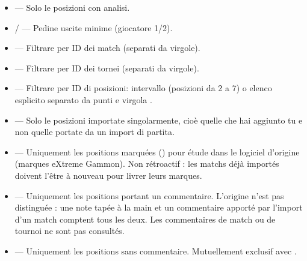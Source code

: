 \documentclass[letterpaper,10pt,italian]{sphinxmanual}
\begin{document}
\begin{itemize}
\item {} 
\sphinxAtStartPar
{} — Solo le posizioni con analisi.

\item {} 
\sphinxAtStartPar
{} /  — Pedine uscite minime (giocatore 1/2).

\item {} 
\sphinxAtStartPar
{} — Filtrare per ID dei match (separati da virgole).

\item {} 
\sphinxAtStartPar
{} — Filtrare per ID dei tornei (separati da virgole).

\item {} 
\sphinxAtStartPar
{} — Filtrare per ID di posizioni: intervallo  (posizioni da 2 a 7) o elenco esplicito separato da punti e virgola .

\item {} 
\sphinxAtStartPar
{} — Solo le posizioni importate singolarmente, cioè quelle che hai aggiunto tu e non quelle portate da un import di partita.

\item {} 
\sphinxAtStartPar
{} — Uniquement les positions marquées () pour étude dans
le logiciel d’origine (marques eXtreme Gammon). Non rétroactif : les
matchs déjà importés doivent l’être à nouveau pour livrer leurs marques.

\item {} 
\sphinxAtStartPar
{} — Uniquement les positions portant un commentaire.
L’origine n’est pas distinguée : une note tapée à la main et un commentaire
apporté par l’import d’un match comptent tous les deux. Les commentaires de
match ou de tournoi ne sont pas consultés.

\item {} 
\sphinxAtStartPar
{} — Uniquement les positions sans commentaire. Mutuellement
exclusif avec .

\end{itemize}
\end{document}
